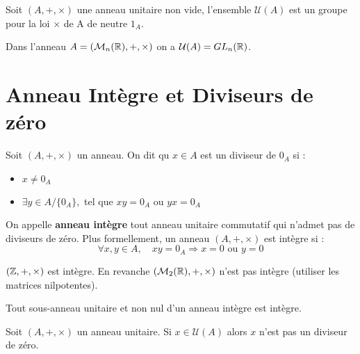 \begin{theorem}
    Soit $(A,+,\times)$ une anneau unitaire non vide, l'ensemble $\mathcal{U}(A)$ est un groupe pour la loi $\times$ 
    de A de neutre $1_A$. 
\end{theorem}

\begin{example}
    Dans l'anneau $A = (\mathcal{M}_n(\mathbb{R}),+,\times)$ on a $\mathcal{U}(A) = GL_n(\mathbb{R})$. 
\end{example}


\section{Anneau Intègre et Diviseurs de zéro}

\begin{definition}
    Soit $(A,+,\times)$ un anneau. On dit qu $x \in A$ est un diviseur de $0_A$ si :
    \begin{itemize}
        \item $x \not = 0_A$ 
        \item $ \exists y \in A/\{0_A\},$ tel que $xy = 0_A$ ou $yx = 0_A$
    \end{itemize}
    On appelle \textbf{anneau intègre} tout anneau unitaire commutatif qui n'admet pas de diviseurs de zéro. 
    Plus formellement, un anneau $(A,+,\times)$ est intègre si : 
        \[ \forall x,y \in A, \quad xy = 0_A \Longrightarrow x = 0 \text{ ou } y = 0 \] 
\end{definition}

\begin{example}
    $(\mathbb{Z},+,\times)$ est intègre. En revanche $(\mathcal{M}_2(\mathbb{R}),+,\times)$ n'est pas intègre (utiliser les matrices nilpotentes). 
\end{example}

\begin{proposition}
    Tout sous-anneau unitaire et non nul d'un anneau intègre est intègre. 
\end{proposition}

\begin{proposition}
    Soit $(A,+,\times)$ un anneau unitaire. Si $x \in \mathcal{U}(A)$ alors $x$ n'est pas un diviseur de zéro. 
\end{proposition}

